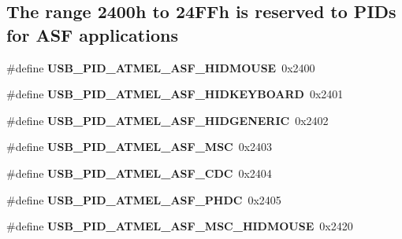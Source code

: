 \subsection*{The range 2400h to 24\-F\-Fh is reserved to P\-I\-Ds for A\-S\-F applications}
\begin{DoxyCompactItemize}
\item 
\hypertarget{group__usb__atmel__ids__group_ga3a1418d88f7099d73faec60665ce7d81}{\#define {\bfseries U\-S\-B\-\_\-\-P\-I\-D\-\_\-\-A\-T\-M\-E\-L\-\_\-\-A\-S\-F\-\_\-\-H\-I\-D\-M\-O\-U\-S\-E}~0x2400}\label{group__usb__atmel__ids__group_ga3a1418d88f7099d73faec60665ce7d81}

\item 
\hypertarget{group__usb__atmel__ids__group_gac72181eda2a796ac5a4a71e8e95c87eb}{\#define {\bfseries U\-S\-B\-\_\-\-P\-I\-D\-\_\-\-A\-T\-M\-E\-L\-\_\-\-A\-S\-F\-\_\-\-H\-I\-D\-K\-E\-Y\-B\-O\-A\-R\-D}~0x2401}\label{group__usb__atmel__ids__group_gac72181eda2a796ac5a4a71e8e95c87eb}

\item 
\hypertarget{group__usb__atmel__ids__group_gaf0a0133931a417e588db53155f0b57bf}{\#define {\bfseries U\-S\-B\-\_\-\-P\-I\-D\-\_\-\-A\-T\-M\-E\-L\-\_\-\-A\-S\-F\-\_\-\-H\-I\-D\-G\-E\-N\-E\-R\-I\-C}~0x2402}\label{group__usb__atmel__ids__group_gaf0a0133931a417e588db53155f0b57bf}

\item 
\hypertarget{group__usb__atmel__ids__group_ga95ee70f17ac736943794b9cf500a403d}{\#define {\bfseries U\-S\-B\-\_\-\-P\-I\-D\-\_\-\-A\-T\-M\-E\-L\-\_\-\-A\-S\-F\-\_\-\-M\-S\-C}~0x2403}\label{group__usb__atmel__ids__group_ga95ee70f17ac736943794b9cf500a403d}

\item 
\hypertarget{group__usb__atmel__ids__group_ga76b8f8d1528bd59987d62aa478166265}{\#define {\bfseries U\-S\-B\-\_\-\-P\-I\-D\-\_\-\-A\-T\-M\-E\-L\-\_\-\-A\-S\-F\-\_\-\-C\-D\-C}~0x2404}\label{group__usb__atmel__ids__group_ga76b8f8d1528bd59987d62aa478166265}

\item 
\hypertarget{group__usb__atmel__ids__group_ga2a6973f1a3071bfe3464a18186316a69}{\#define {\bfseries U\-S\-B\-\_\-\-P\-I\-D\-\_\-\-A\-T\-M\-E\-L\-\_\-\-A\-S\-F\-\_\-\-P\-H\-D\-C}~0x2405}\label{group__usb__atmel__ids__group_ga2a6973f1a3071bfe3464a18186316a69}

\item 
\hypertarget{group__usb__atmel__ids__group_ga830b4cd806d1622c0a701b33f382e123}{\#define {\bfseries U\-S\-B\-\_\-\-P\-I\-D\-\_\-\-A\-T\-M\-E\-L\-\_\-\-A\-S\-F\-\_\-\-M\-S\-C\-\_\-\-H\-I\-D\-M\-O\-U\-S\-E}~0x2420}\label{group__usb__atmel__ids__group_ga830b4cd806d1622c0a701b33f382e123}


\end{DoxyCompactItemize}

